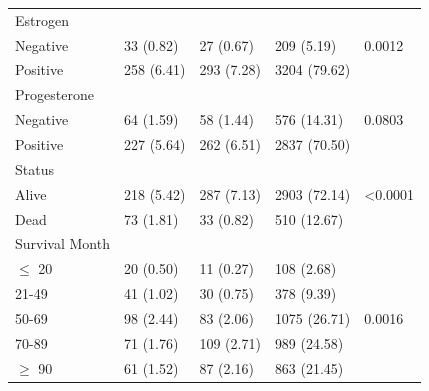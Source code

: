 \documentclass[times,sort&compress,3p]{elsarticle}
\theoremstyle{plain}
\theoremstyle{definition}
\begin{document}
\begin{table}[t]
\centering
\begin{tabular}{lllll} 

Estrogen                  &              &                &                &                    \\
Negative                  & 33 (0.82)    & 27 (0.67)      & 209 (5.19)     & 0.0012             \\
Positive                  & 258 (6.41)   & 293 (7.28)     & 3204 (79.62)   &                    \\ \hline
Progesterone              &              &                &                &                    \\
Negative                  & 64 (1.59)    & 58 (1.44)      & 576 (14.31)    & 0.0803             \\
Positive                  & 227 (5.64)   & 262 (6.51)     & 2837 (70.50)   &                    \\ \hline
Status                    &              &                &                &                    \\
Alive                     & 218 (5.42)   & 287 (7.13)     & 2903 (72.14)   & \textless   0.0001 \\
Dead                      & 73 (1.81)    & 33 (0.82)      & 510 (12.67)    &                    \\ \hline
Survival Month            &              &                &                &                    \\
$\leq$ 20                      & 20 (0.50)    & 11 (0.27)      & 108 (2.68)     &                    \\
21-49                     & 41 (1.02)    & 30 (0.75)      & 378 (9.39)     &                    \\
50-69                     & 98 (2.44)    & 83 (2.06)      & 1075 (26.71)   & 0.0016             \\
70-89                     & 71 (1.76)    & 109 (2.71)     & 989 (24.58)    &                    \\
$\geq$ 90                      & 61 (1.52)    & 87 (2.16)      & 863 (21.45)    &                    \\ \hline


\end{tabular}
\end{table}
\end{document}
